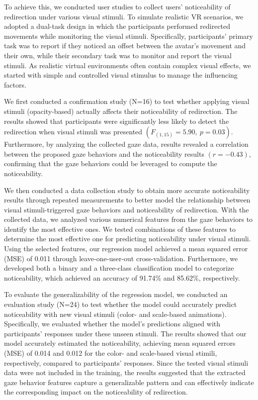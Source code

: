 To achieve this, we conducted user studies to collect users' noticeability of redirection under various visual stimuli.
To simulate realistic VR scenarios, we adopted a dual-task design in which the participants performed redirected movements while monitoring the visual stimuli.
Specifically, participants' primary task was to report if they noticed an offset between the avatar's movement and their own, while their secondary task was to monitor and report the visual stimuli.
As realistic virtual environments often contain complex visual effects, we started with simple and controlled visual stimulus to manage the influencing factors.

We first conducted a confirmation study (N=16) to test whether applying visual stimuli (opacity-based) actually affects their noticeability of redirection. 
The results showed that participants were significantly less likely to detect the redirection when visual stimuli was presented $(F_{(1,15)}=5.90,~p=0.03)$.
Furthermore, by analyzing the collected gaze data, results revealed a correlation between the proposed gaze behaviors and the noticeability results $(r=-0.43)$, confirming that the gaze behaviors could be leveraged to compute the noticeability.

We then conducted a data collection study to obtain more accurate noticeability results through repeated measurements to better model the relationship between visual stimuli-triggered gaze behaviors and noticeability of redirection.
With the collected data, we analyzed various numerical features from the gaze behaviors to identify the most effective ones. 
We tested combinations of these features to determine the most effective one for predicting noticeability under visual stimuli.
Using the selected features, our regression model achieved a mean squared error (MSE) of 0.011 through leave-one-user-out cross-validation. 
Furthermore, we developed both a binary and a three-class classification model to categorize noticeability, which achieved an accuracy of 91.74\% and 85.62\%, respectively.

To evaluate the generalizability of the regression model, we conducted an evaluation study (N=24) to test whether the model could accurately predict noticeability with new visual stimuli (color- and scale-based animations).
Specifically, we evaluated whether the model's predictions aligned with participants' responses under these unseen stimuli.
The results showed that our model accurately estimated the noticeability, achieving mean squared errors (MSE) of 0.014 and 0.012 for the color- and scale-based visual stimili, respectively, compared to participants' responses.
Since the tested visual stimuli data were not included in the training, the results suggested that the extracted gaze behavior features capture a generalizable pattern and can effectively indicate the corresponding impact on the noticeability of redirection.

